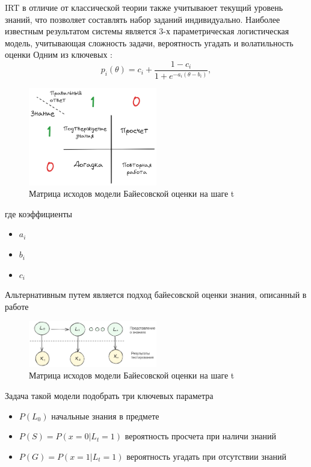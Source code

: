 IRT в отличие от классической теории также учитываюет текущий уровень знаний, что позволяет составлять набор заданий индивидуально.
Наиболее известным результатом системы является 3-х параметрическая логистическая модель, учитывающая сложность задачи, вероятность угадать и волатильность оценки Одним из ключевых \cite{lord1956measurement}:
\begin{equation}
    p_i(\theta) = c_i + \frac{1-c_i}{1+e^{-a_i(\theta-b_i)}},
\end{equation}
\begin{figure}[h]
    \centering
    \includegraphics[width=0.5\textwidth]{assets/work/rating/bkt.excalidraw.png}
    \caption{Матрица исходов модели Байесовской оценки на шаге t}
    \label{IRT}
\end{figure}

где коэффициенты \begin{itemize}
    \item $a_i$
    \item $b_i$
    \item $c_i$
\end{itemize}

Альтернативным путем является подход байесовской оценки знания,
описанный в работе \cite{corbett1994knowledge}
\begin{figure}[h]
    \centering
    \includegraphics[width=0.5\textwidth]{assets/pedagogic/social/bkt_automata.excalidraw.png}
    \caption{Матрица исходов модели Байесовской оценки на шаге t}
    \label{bkt}
\end{figure}
Задача такой модели подобрать три ключевых параметра \begin{itemize}
    \item $P(L_0)$ начальные знания в предмете
    \item $P(S) = P(x=0| L_t = 1)$ вероятность просчета при наличи знаний
    \item  $P(G) = P(x=1| L_t = 1)$ вероятность угадать при отсутствии знаний
\end{itemize}

